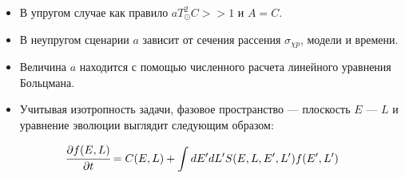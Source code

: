 \begin{itemize}
	\item В упругом случае как правило $aT_{\odot}^2C >> 1$ и $A = C$. 
	\item В неупругом сценарии $a$ зависит от сечения рассения $\sigma_{\chi p}$, модели и времени.
	\item Величина $a$ находится с помощью численного расчета линейного уравнения Больцмана.
	\item Учитывая изотропность задачи, фазовое пространство --- плоскость $E$ --- $L$ и уравнение эволюции выглядит следующим образом:
\end{itemize}

\begin{equation*}
	\begin{split}
		\cfrac{\partial f(E,L)}{\partial t} = C(E,L)
		+ \int{dE'dL' S(E,L,E',L') f(E',L')}
	\end{split}
\end{equation*}
